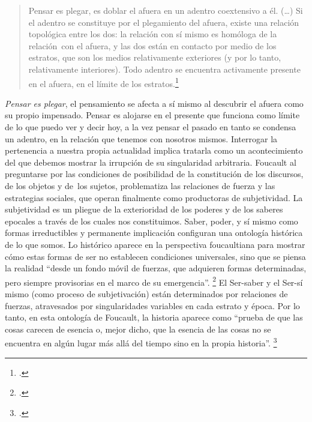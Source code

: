 \begin{quote}
Pensar es plegar, es doblar el afuera en un adentro coextensivo a él. (\ldots) Si el adentro se constituye por el plegamiento del afuera, existe una relación topológica entre los dos: la relación con sí mismo es homóloga de la relación~con el afuera, y las dos están en contacto por medio de los estratos, que son los medios relativamente exteriores (y por lo tanto, relativamente interiores). Todo adentro se encuentra activamente presente en el afuera, en el límite de los estratos.\footcite[][154-155]{@7053-DELEUZE2008}
\end{quote}

\emph{Pensar es plegar}, el pensamiento se afecta a sí mismo al descubrir el afuera como su propio impensado. Pensar es alojarse en el presente que funciona como límite de lo que puedo ver y decir hoy, a la vez pensar el pasado en tanto se condensa un adentro, en la relación que tenemos con nosotros mismos. Interrogar la pertenencia a nuestra propia actualidad implica tratarla como un acontecimiento del que debemos mostrar la irrupción de su singularidad arbitraria. Foucault al preguntarse por las condiciones de posibilidad de la constitución de los discursos, de los objetos y de~los sujetos, problematiza las relaciones de fuerza y las estrategias sociales, que operan finalmente como productoras de subjetividad. La subjetividad es un pliegue de la exterioridad de los poderes y de los saberes epocales a través de los cuales nos constituimos. Saber, poder, y sí mismo como formas irreductibles y permanente implicación configuran una ontología histórica de lo que somos. Lo histórico aparece en la perspectiva foucaultiana para mostrar cómo estas formas de ser no establecen condiciones universales, sino que se piensa la realidad \enquote{desde un fondo móvil de fuerzas, que adquieren formas determinadas, pero siempre provisorias en el marco de su emergencia}. \footcite[][19]{@7052-COLOMBANI2008} El Ser-saber y el Ser-sí mismo (como proceso de subjetivación) están determinados por relaciones de fuerzas, atravesados por singularidades variables en cada estrato y época. Por lo tanto, en esta ontología de Foucault, la historia aparece como \enquote{prueba de que las cosas carecen de esencia o, mejor dicho, que la esencia de las cosas no se encuentra en algún lugar más allá del tiempo sino en la propia historia}. \footcite[][85]{@7058-MOROABADIA2006}

